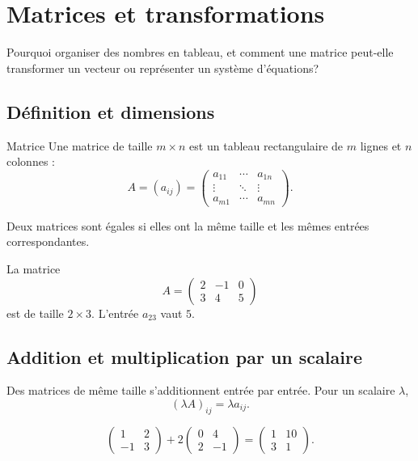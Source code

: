 \chapter{Matrices et transformations}
\label{manual:chapter:11}

\begin{questionbox}
Pourquoi organiser des nombres en tableau, et comment une matrice peut-elle transformer un vecteur ou représenter un système d'équations?
\end{questionbox}

\section{Définition et dimensions}
\label{manual:section:11.01}

\begin{definition}{Matrice}{}
Une matrice de taille $m\times n$ est un tableau rectangulaire de $m$ lignes et $n$ colonnes :
\[
A=(a_{ij})=
\begin{pmatrix}
a_{11}&\cdots&a_{1n}\\
\vdots&\ddots&\vdots\\
a_{m1}&\cdots&a_{mn}
\end{pmatrix}.
\]
\end{definition}

Deux matrices sont égales si elles ont la même taille et les mêmes entrées correspondantes.

\begin{examplebox}
La matrice
\[
A=\begin{pmatrix}2&-1&0\\3&4&5\end{pmatrix}
\]
est de taille $2\times3$. L'entrée $a_{23}$ vaut $5$.
\end{examplebox}

\section{Addition et multiplication par un scalaire}
\label{manual:section:11.02}

Des matrices de même taille s'additionnent entrée par entrée. Pour un scalaire $\lambda$,
\[
(\lambda A)_{ij}=\lambda a_{ij}.
\]

\begin{examplebox}
\[
\begin{pmatrix}1&2\\-1&3\end{pmatrix}
+2\begin{pmatrix}0&4\\2&-1\end{pmatrix}
=
\begin{pmatrix}1&10\\3&1\end{pmatrix}.
\]
\end{examplebox}

